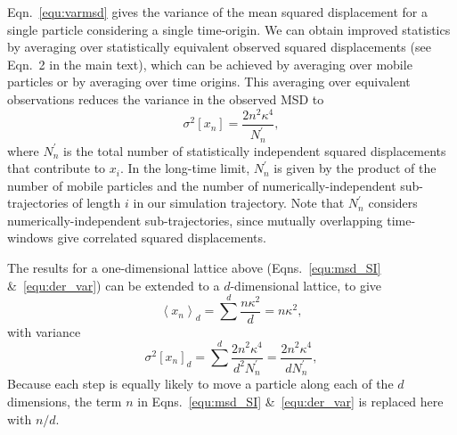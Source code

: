 \documentclass[reprint,superscriptaddress,nobibnotes,amsmath,amssymb,aps,prx,hidelinks,linenumbers]{revtex4-2}
\newcommand{\oMSDi}{\ensuremath{x_i}}
\newcommand{\oMSDn}{\ensuremath{x_n}}
\newcommand{\moMSDn}{\ensuremath{\left<\oMSDn\right>}}
\newcommand{\nind}[1]{\ensuremath{N^\prime_{#1}}}
\newcommand{\var}[1]{\ensuremath{\sigma^2[#1]}}
\begin{document}
Eqn.~\ref{equ:varmsd} gives the variance of the mean squared displacement for a single particle considering a single time-origin.
We can obtain improved statistics by averaging over statistically equivalent observed squared displacements (see Eqn.~2 in the main text), which can be achieved by averaging over mobile particles or by averaging over time origins.
This averaging over equivalent observations reduces the variance in the observed MSD to
\begin{equation}
    \var{\oMSDn} = \frac{2n^2\kappa^4}{\nind{n}},
\label{equ:der_var}
\end{equation}
where $\nind{n}$ is the total number of statistically independent squared displacements that contribute to $\oMSDi$.
In the long-time limit, $\nind{n}$ is given by the product of the number of mobile particles and the number of numerically-independent sub-trajectories of length $i$ in our simulation trajectory.
Note that $\nind{n}$ considers numerically-independent sub-trajectories, since mutually overlapping time-windows give correlated squared displacements.

The results for a one-dimensional lattice above (Eqns.~\ref{equ:msd_SI} \&~\ref{equ:der_var}) can be extended to a $d$-dimensional lattice, to give
\begin{equation}
    \moMSDn_{d} = \sum^d{\frac{n\kappa^2}{d}} = n\kappa^2,
\end{equation}
with variance
\begin{equation}
    \var{\oMSDn}_d = \sum^d{\frac{2n^2\kappa^4}{d^2\nind{n}}} = \frac{2n^2\kappa^4}{d\nind{n}},
\end{equation}
Because each step is equally likely to move a particle along each of the $d$ dimensions, the term $n$ in Eqns.~\ref{equ:msd_SI} \&~\ref{equ:der_var} is replaced here with $n/d$.
\end{document}
